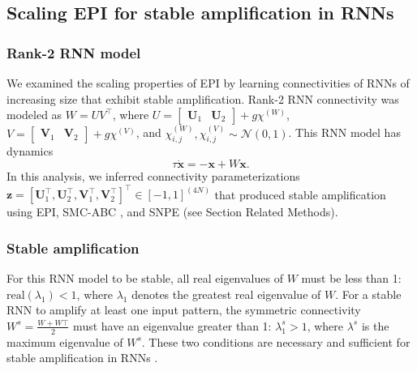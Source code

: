 \documentclass[11pt]{article}
\begin{document}
\subsection{Scaling EPI for stable amplification in RNNs}\label{methods_RNN}
\subsubsection{Rank-2 RNN model}
We examined the scaling properties of EPI by learning connectivities of RNNs of increasing size that exhibit stable amplification.
Rank-2 RNN connectivity was modeled as $W = UV^\top$, where $U = \begin{bmatrix} \mathbf{U}_1 & \mathbf{U}_2 \end{bmatrix} + g \chi^{(W)}$, $V = \begin{bmatrix} \mathbf{V}_1 & \mathbf{V}_2 \end{bmatrix} + g\chi^{(V)}$, and $\chi^{(W)}_{i,j}, \chi^{(V)}_{i,j} \sim \mathcal{N}(0, 1)$.
This RNN model has dynamics
\begin{equation}
\tau \dot{\mathbf{x}} = -\mathbf{x} + W\mathbf{x}.
\end{equation}
In this analysis, we inferred connectivity parameterizations $\mathbf{z} = \left[\mathbf{U}_1^\top, \mathbf{U}_2^\top, \mathbf{V}_1^\top, \mathbf{V}_2^\top \right]^\top \in \left[-1, 1 \right]^{(4N)}$   that produced stable amplification using EPI, SMC-ABC \cite{sisson2007sequential}, and SNPE \cite{gonccalves2019training} (see Section Related Methods).

\subsubsection{Stable amplification}
For this RNN model to be stable, all real eigenvalues of $W$ must be less than 1:  $\text{real}(\lambda_1) < 1$, where $\lambda_1$ denotes the greatest real eigenvalue of $W$.
For a stable RNN to amplify at least one input pattern, the symmetric connectivity $W^s = \frac{W + W\top}{2}$ must have an eigenvalue greater than 1:
$\lambda^s_1 > 1$, where  $\lambda^s$ is the maximum eigenvalue of $W^s$.
These two conditions are necessary and sufficient for stable amplification in RNNs \cite{bondanelli2020coding}.
\end{document}
